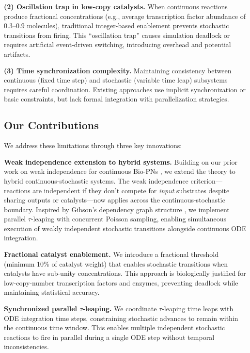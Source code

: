 \documentclass{bioinfo}
\begin{document}
\textbf{(2) Oscillation trap in low-copy catalysts.} When continuous reactions produce fractional concentrations (e.g., average transcription factor abundance of 0.3--0.9 molecules), traditional integer-based enablement prevents stochastic transitions from firing. This ``oscillation trap'' causes simulation deadlock or requires artificial event-driven switching, introducing overhead and potential artifacts.

\textbf{(3) Time synchronization complexity.} Maintaining consistency between continuous (fixed time step) and stochastic (variable time leap) subsystems requires careful coordination. Existing approaches use implicit synchronization or basic constraints, but lack formal integration with parallelization strategies.

\subsection{Our Contributions}

We address these limitations through three key innovations:

\textbf{Weak independence extension to hybrid systems.} Building on our prior work on weak independence for continuous Bio-PNs \citep{eugenio2024weak}, we extend the theory to hybrid continuous-stochastic systems. The weak independence criterion---reactions are independent if they don't compete for \emph{input} substrates despite sharing outputs or catalysts---now applies across the continuous-stochastic boundary. Inspired by Gibson's dependency graph structure \citep{gibson2000efficient}, we implement parallel $\tau$-leaping with concurrent Poisson sampling, enabling simultaneous execution of weakly independent stochastic transitions alongside continuous ODE integration.

\textbf{Fractional catalyst enablement.} We introduce a fractional threshold (minimum 10\% of catalyst weight) that enables stochastic transitions when catalysts have sub-unity concentrations. This approach is biologically justified for low-copy-number transcription factors and enzymes, preventing deadlock while maintaining statistical accuracy.

\textbf{Synchronized parallel $\tau$-leaping.} We coordinate $\tau$-leaping time leaps with ODE integration time steps, constraining stochastic advances to remain within the continuous time window. This enables multiple independent stochastic reactions to fire in parallel during a single ODE step without temporal inconsistencies.
\end{document}
